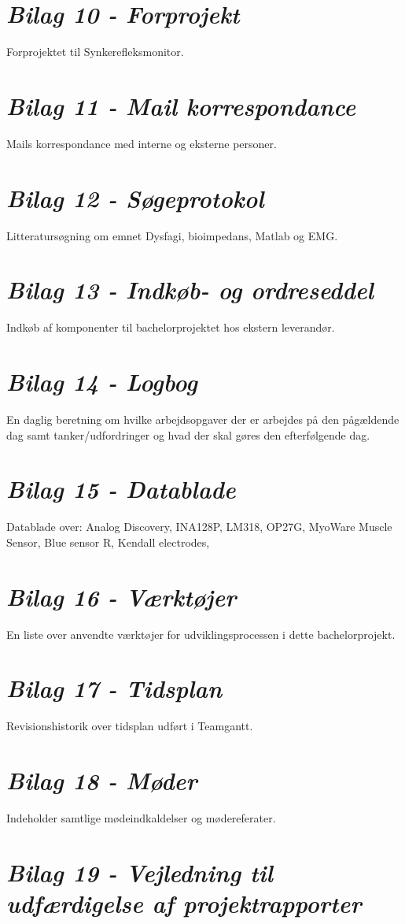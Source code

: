 \section*{\textit{Bilag 10 - Forprojekt}} \label{bilag10}
Forprojektet til Synkerefleksmonitor.
\section*{\textit{Bilag 11 - Mail korrespondance}} \label{bilag11}
Mails korrespondance med interne og eksterne personer.
\section*{\textit{Bilag 12 - Søgeprotokol}} \label{bilag12}
Litteratursøgning om emnet Dysfagi, bioimpedans, Matlab og EMG. 
\section*{\textit{Bilag 13 - Indkøb- og ordreseddel}} \label{bilag13}
Indkøb af komponenter til bachelorprojektet hos ekstern leverandør.
\section*{\textit{Bilag 14 - Logbog}} \label{bilag14}
En daglig beretning om hvilke arbejdsopgaver der er arbejdes på den pågældende dag samt tanker/udfordringer og hvad der skal gøres den efterfølgende dag.
\section*{\textit{Bilag 15 - Datablade}} \label{bilag15}
Datablade over: Analog Discovery, INA128P, LM318, OP27G, MyoWare Muscle Sensor, Blue sensor R, Kendall electrodes,
\section*{\textit{Bilag 16 - Værktøjer}} \label{bilag16}
En liste over anvendte værktøjer for udviklingsprocessen i dette bachelorprojekt.
\section*{\textit{Bilag 17 - Tidsplan}} \label{bilag17}
Revisionshistorik over tidsplan udført i Teamgantt.
\section*{\textit{Bilag 18 - Møder}} \label{bilag18}
Indeholder samtlige mødeindkaldelser og mødereferater.
\section*{\textit{Bilag 19 - Vejledning til udfærdigelse af projektrapporter}} \label{bilag19}





